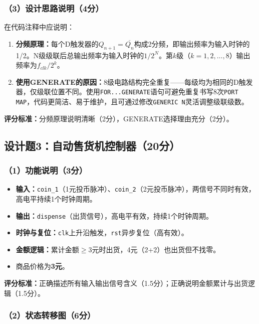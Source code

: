 \subsubsection*{（3）设计思路说明（4分）}

在代码注释中应说明：
\begin{enumerate}
  \item \textbf{分频原理：}每个D触发器的$Q_{n+1}=\overline{Q_n}$构成2分频，即输出频率为输入时钟的1/2。N级级联后总输出频率为输入时钟的$1/2^N$。第$k$级（$k=1,2,\dots,8$）输出频率为$f_{clk}/2^k$。
  \item \textbf{使用GENERATE的原因：}8级电路结构完全重复——每级均为相同的D触发器，仅级联位置不同。使用\texttt{FOR...GENERATE}语句可避免重复书写8次\texttt{PORT MAP}，代码更简洁、易于维护，且可通过修改\texttt{GENERIC N}灵活调整级联级数。
\end{enumerate}

\textbf{评分标准：}分频原理说明清晰（2分），GENERATE选择理由充分（2分）。

\newpage

\subsection*{设计题3：自动售货机控制器（20分）}

\subsubsection*{（1）功能说明（3分）}

\begin{itemize}
  \item \textbf{输入：}\texttt{coin\_1}（1元投币脉冲）、\texttt{coin\_2}（2元投币脉冲），两信号不同时有效，高电平持续1个时钟周期。
  \item \textbf{输出：}\texttt{dispense}（出货信号），高电平有效，持续1个时钟周期。
  \item \textbf{时钟与复位：}\texttt{clk}上升沿触发，\texttt{rst}异步复位（高有效）。
  \item \textbf{金额逻辑：}累计金额$\ge3$元时出货，4元（2+2）也出货但不找零。
  \item 商品价格为\textbf{3元}。
\end{itemize}
\textbf{评分标准：}正确描述所有输入输出信号含义（1.5分）；正确说明金额累计与出货逻辑（1.5分）。

\subsubsection*{（2）状态转移图（6分）}

